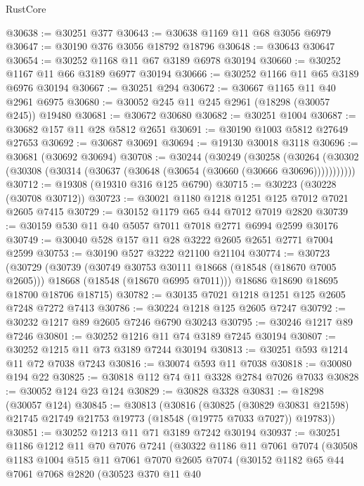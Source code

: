 \begin{lexlean}{RustCore}
\begin{coremodule}
@30638 := @30251 @377
@30643 := @30638 @1169 @11 @68 @3056 @6979
@30647 := @30190 @376 @3056 @18792 @18796
@30648 := @30643 @30647
@30654 := @30252 @1168 @11 @67 @3189 @6978 @30194
@30660 := @30252 @1167 @11 @66 @3189 @6977 @30194
@30666 := @30252 @1166 @11 @65 @3189 @6976 @30194
@30667 := @30251 @294
@30672 := @30667 @1165 @11 @40 @2961 @6975
@30680 := @30052 @245 @11 @245 @2961 (@18298 (@30057 @245)) @19480
@30681 := @30672 @30680
@30682 := @30251 @1004
@30687 := @30682 @157 @11 @28 @5812 @2651
@30691 := @30190 @1003 @5812 @27649 @27653
@30692 := @30687 @30691
@30694 := @19130 @30018 @3118
@30696 := @30681 (@30692 @30694)
@30708 := @30244
    (@30249
      (@30258
        (@30264 (@30302 (@30308 (@30314 (@30637 (@30648 (@30654 (@30660 (@30666 @30696)))))))))))
@30712 := @19308 (@19310 @316 @125 @6790)
@30715 := @30223 (@30228 (@30708 @30712))
@30723 := @30021 @1180 @1218 @1251 @125 @7012 @7021 @2605 @7415
@30729 := @30152 @1179 @65 @44 @7012 @7019 @2820
@30739 := @30159 @530 @11 @40 @5057 @7011 @7018 @2771 @6994 @2599 @30176
@30749 := @30040 @528 @157 @11 @28 @3222 @2605 @2651 @2771 @7004 @2599
@30753 := @30190 @527 @3222 @21100 @21104
@30774 := @30723
    (@30729
      (@30739
        (@30749 @30753 @30111 @18668 (@18548 (@18670 @7005 @2605)))
        @18668
        (@18548 (@18670 @6995 @7011)))
      @18686
      @18690
      @18695
      @18700
      @18706
      @18715)
@30782 := @30135 @7021 @1218 @1251 @125 @2605 @7248 @7272 @7413
@30786 := @30224 @1218 @125 @2605 @7247
@30792 := @30232 @1217 @89 @2605 @7246 @6790 @30243
@30795 := @30246 @1217 @89 @7246
@30801 := @30252 @1216 @11 @74 @3189 @7245 @30194
@30807 := @30252 @1215 @11 @73 @3189 @7244 @30194
@30813 := @30251 @593 @1214 @11 @72 @7038 @7243
@30816 := @30074 @593 @11 @7038
@30818 := @30080 @194 @22
@30825 := @30818 @112 @74 @11 @3328 @2784 @7026 @7033
@30828 := @30052 @124 @23 @124
@30829 := @30828 @3328
@30831 := @18298 (@30057 @124)
@30845 := @30813
    (@30816
      (@30825
        (@30829 @30831 @21598)
        @21745
        @21749
        @21753
        @19773
        (@18548 (@19775 @7033 @7027))
        @19783))
@30851 := @30252 @1213 @11 @71 @3189 @7242 @30194
@30937 := @30251
    @1186
    @1212
    @11
    @70
    @7076
    @7241
    (@30322
      @1186
      @11
      @7061
      @7074
      (@30508
        @1183
        @1004
        @515
        @11
        @7061
        @7070
        @2605
        @7074
        (@30152
          @1182
          @65
          @44
          @7061
          @7068
          @2820
          (@30523
            @370
            @11
            @40

\end{coremodule}
\end{lexlean}
